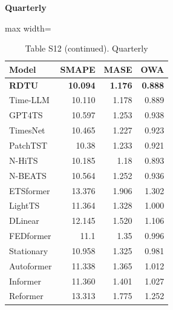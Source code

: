\begin{table}[H]\centering\small
\caption*{Table S12 (continued). Quarterly}
\textbf{Quarterly}\par\smallskip
\begin{adjustbox}{max width=\linewidth}\begin{tabular}{lrrr}\toprule
\textbf{Model} & \textbf{SMAPE} & \textbf{MASE} & \textbf{OWA}\\\midrule
\rowcolor{blue!5}
\textbf{RDTU} & \textbf{10.094} & \textbf{1.176} & \textbf{0.888}\\
Time-LLM & 10.110 & 1.178 & 0.889\\
GPT4TS & 10.597 & 1.253 & 0.938\\
TimesNet & 10.465 & 1.227 & 0.923\\
PatchTST & 10.38 & 1.233 & 0.921\\
N-HiTS & 10.185 & 1.18 & 0.893\\
N-BEATS & 10.564 & 1.252 & 0.936\\
ETSformer & 13.376 & 1.906 & 1.302\\
LightTS & 11.364 & 1.328 & 1.000\\
DLinear & 12.145 & 1.520 & 1.106\\
FEDformer & 11.1 & 1.35 & 0.996\\
Stationary & 10.958 & 1.325 & 0.981\\
Autoformer & 11.338 & 1.365 & 1.012\\
Informer & 11.360 & 1.401 & 1.027\\
Reformer & 13.313 & 1.775 & 1.252\\
\bottomrule\end{tabular}\end{adjustbox}\end{table}
